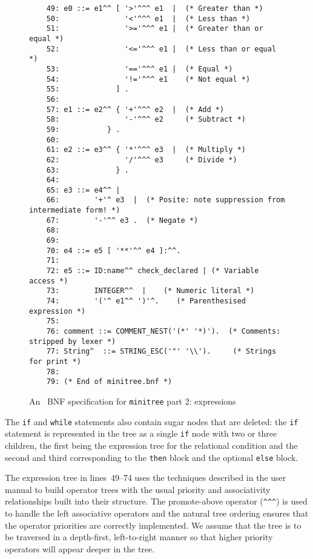 \begin{figure}
\hspace*{-0.5cm}
\begin{minipage}{30cm}
\footnotesize
\begin{verbatim}
    49: e0 ::= e1^^ [ '>'^^^ e1  |  (* Greater than *)
    50:               '<'^^^ e1  |  (* Less than *)
    51:               '>='^^^ e1 |  (* Greater than or equal *)
    52:               '<='^^^ e1 |  (* Less than or equal *)
    53:               '=='^^^ e1 |  (* Equal *)
    54:               '!='^^^ e1    (* Not equal *)
    55:             ] .
    56: 
    57: e1 ::= e2^^ { '+'^^^ e2  |  (* Add *)
    58:               '-'^^^ e2     (* Subtract *)
    59:           } .
    60: 
    61: e2 ::= e3^^ { '*'^^^ e3  |  (* Multiply *)
    62:               '/'^^^ e3     (* Divide *)
    63:             } .
    64: 
    65: e3 ::= e4^^ | 
    66:        '+'^ e3  |  (* Posite: note suppression from intermediate form! *)
    67:        '-'^^ e3 .  (* Negate *)
    68:              
    69: 
    70: e4 ::= e5 [ '**'^^ e4 ]:^^.
    71: 
    72: e5 ::= ID:name^^ check_declared | (* Variable access *)
    73:        INTEGER^^  |    (* Numeric literal *)
    74:        '('^ e1^^ ')'^.    (* Parenthesised expression *)
    75: 
    76: comment ::= COMMENT_NEST('(*' '*)').  (* Comments: stripped by lexer *)
    77: String^  ::= STRING_ESC('"' '\\').     (* Strings for print *)
    78: 
    79: (* End of minitree.bnf *)
\end{verbatim}
\end{minipage}
\caption{An \rdp\ BNF specification for {\tt minitree} part 2: expressions}
\label{minitree.bnf:2}
\end{figure}
The {\tt if} and {\tt while} statements also contain sugar nodes that
are deleted: the {\tt if} statement is represented in the tree as a
single {\tt if} node with two or three children, the first being the
expression tree for the relational condition and the second and third
corresponding to the {\tt then} block and the optional {\tt else} block.

The expression tree in lines~49--74 uses the techniques described in the user
manual to build operator trees with the usual priority and associativity
relationships built into their structure. The promote-above operator (\verb|^^^|) is
used to handle the left associative operators and the natural tree ordering ensures
that the operator priorities are correctly implemented. We assume that the tree is
to be traversed in a depth-first, left-to-right manner so that higher priority operators
will appear deeper in the tree.

